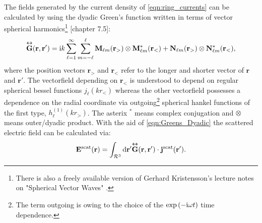 The fields generated by the current density of \cref{eqn:ring_currents} can be
calculated by using the dyadic Green's function written in terms of vector spherical harmonics\footnote{There is also a freely available version of Gerhard Kristensson's lecture notes on "Spherical Vector Waves" \citep{Kristensson2014}.} \Cite{Kristensson2016}[chapter 7.5]:
\begin{equation}
\overset{\bm\leftrightarrow}{\mathbf{G}}(\mathbf{r},\mathbf{r}') = \mathrm{i} k \sum_{\ell=1}^\infty \sum_{m=-\ell}^\ell
\mathbf{M}_{\ell m}(\mathbf{r}_>)\otimes\mathbf{M}_{\ell m}^*(\mathbf{r}_<)+
\mathbf{N}_{\ell m}(\mathbf{r}_>)\otimes\mathbf{N}_{\ell m}^*(\mathbf{r}_<),
\label{eqn:Greens_Dyadic}
\end{equation}
where the position vectors $\mathbf{r}_>$ and $\mathbf{r}_<$ refer to the longer and shorter vector of $\mathbf{r}$ and $\mathbf{r}'$. The vectorfield depending on $\mathbf{r}_<$ is understood to depend on regular spherical bessel functions $j_\ell(kr_<)$ whereas the other vectorfield possesses a dependence on the radial coordinate via outgoing\footnote{The term outgoing is owing to the choice of the $\exp\left(-\mathrm{i}\omega t\right)$ time dependence.} spherical hankel functions of the first type, $h_\ell^{(1)}(kr_>)$.
The asterix $^*$ means complex conjugation and $\otimes$ means outer/dyadic product. With the aid of \cref{eqn:Greens_Dyadic} the scattered electric field can be calculated via:
\begin{equation}
\mathbf{E}^\text{scat}(\mathbf{r}) = \int_{\mathcal{R}^3}  \mathrm{d} \mathbf{r}' 
\overset{\bm\leftrightarrow}{\mathbf{G}}(\mathbf{r},\mathbf{r}') \cdot \mathbf{j}^\text{scat}(\mathbf{r}').
\label{eqn:E_scattered}
\end{equation}

